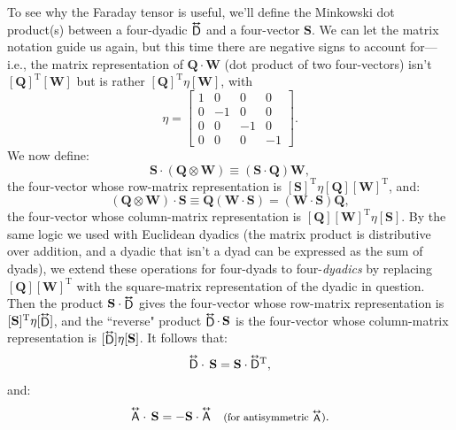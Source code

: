 \documentclass[12pt]{article}
\renewcommand{\vv}[1]{\mathbf{#1}}
\newcommand{\tightoverset}[2]{%
  \mathop{#2}\limits^{\vbox to -.5ex{\kern-0.75ex\hbox{$#1$}\vss}}}
\newcommand{\inlinedy}[1]{\tightoverset{\text{\tiny$\bm\leftrightarrow$}}{#1}}
\newcommand{\fnoverset}[2]{%
  \mathop{#2}\limits^{\vbox to -.5ex{\kern-0.85ex\hbox{$#1$}\vss}}}
\newcommand{\footnotedy}[1]{\fnoverset{\text{\tiny$\bm\leftrightarrow$}}{#1}}
\newcommand{\capdy}[1]{ \overset{ \text{\tiny$\bm\leftrightarrow$} }{\vphantom{\text{\small{A}}}\smash{#1}} }
\begin{document}
To see why the Faraday tensor is useful, we'll define the Minkowski dot product(s) between a four-dyadic $\inlinedy{\mathsf{D}}$ and a four-vector $\vv S$. We can let the matrix notation guide us again, but this time there are negative signs to account for---i.e., the matrix representation of $\vv Q \cdot \vv W$ (dot product of two four-vectors) isn't $[\vv Q]^{\textrm{T}} [\vv W]$ but is rather $[\vv Q]^{\textrm{T}} \eta [\vv W]$, with
\begin{equation}\label{eq:mmt}
\eta
=
\begin{bmatrix}
1 & 0 & 0 & 0 \\
0 & -1 & 0 & 0 \\
0 & 0 & -1 & 0 \\
0 & 0 & 0 & -1
\end{bmatrix} .
\end{equation}
We now define:
\begin{equation}\label{eq:mddp1}
\vv S \cdot (\vv Q \otimes \vv W) \equiv (\vv S \cdot \vv Q) \vv W,
\end{equation}
the four-vector whose row-matrix representation is $[\vv S]^\mathrm{T} \eta [\vv Q] [\vv W]^\mathrm{T}$, and:
\begin{equation}\label{eq:mddp2}
(\vv Q \otimes \vv W) \cdot \vv S \equiv \vv Q (\vv W \cdot \vv S) = (\vv W \cdot \vv S) \vv Q,
\end{equation}
the four-vector whose column-matrix representation is $[\vv Q] [\vv W]^\mathrm{T} \eta [\vv S]$. By the same logic we used with Euclidean dyadics (the matrix product is distributive over addition, and a dyadic that isn't a dyad can be expressed as the sum of dyads), we extend these operations for four-dyads to four-\emph{dyadics} by replacing $[\vv Q][\vv W]^{\textrm{T}}$ with the square-matrix representation of the dyadic in question. Then the product $\vv S \cdot \inlinedy{\mathsf{D}}$ gives the four-vector whose row-matrix representation is $[\vv S]^{\mathrm{T}} \eta [\inlinedy{\mathsf{D}}]$, and the ``reverse" product $\inlinedy{\mathsf{D}} \cdot \, \vv S$ is the four-vector whose column-matrix representation is $[\inlinedy{\mathsf{D}}] \eta [\vv S]$. It follows that:
\begin{equation}\label{eq:mddpid1}
\capdy{\mathsf{D}} \cdot \, \vv S = \vv S \cdot \capdy{\mathsf{D}} {}^\mathrm{T},
\end{equation}
and:
\begin{equation}\label{eq:mddpid2}
\capdy{\mathsf{A}} \cdot \, \vv S = - \vv S \cdot \capdy{\mathsf{A}} \quad \text{\footnotesize{(for antisymmetric $\footnotedy{\mathsf{A}}$)}}.
\end{equation}
\end{document}

